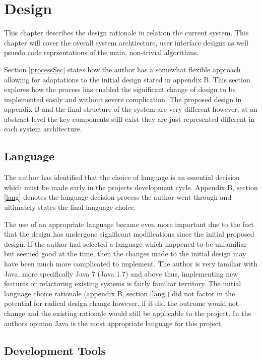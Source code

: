 \chapter{Design}

This chapter describes the design rationale in relation the current system. This chapter will cover the overall system archtiecture, user interface designs as well psuedo code reprsentations of the main, non-trivial algorithms.

\label{DesignSec}
Section \ref{processSec} states how the author has a somewhat flexible approach allowing for adaptations to the initial design stated in appendix B. This section explores how the process has enabled the significant change of design to be implemented easily and without severe complication. The proposed design in appendix B and the final structure of the system are very different however, at an abstract level the key components still exist they are just represented different in each system architecture. 

\section{Language}

The author has identified that the choice of language is an essential decision which must be made early in the projects development cycle. Appendix B, section \ref{lang} denotes the language decision process the author went through and ultimately states the final language choice.

The use of an appropriate language became even more important due to the fact that the design has undergone significant modifications since the initial proposed design. If the author had selected a language which happened to be unfamiliar but seemed good at the time, then the changes made to the initial design may have been much more complicated to implement. The author is very familiar with Java, more specifically Java 7 (Java 1.7) and above thus, implementing new features or refactoring existing systems is fairly familiar territory. The initial language choice rationale (appendix B, section \ref{lang}) did not factor in the potential for radical design change however, if it did the outcome would not change and the existing rationale would still be applicable to the project. In the authors opinion Java is the most appropriate language for this project.

\section{Development Tools}
